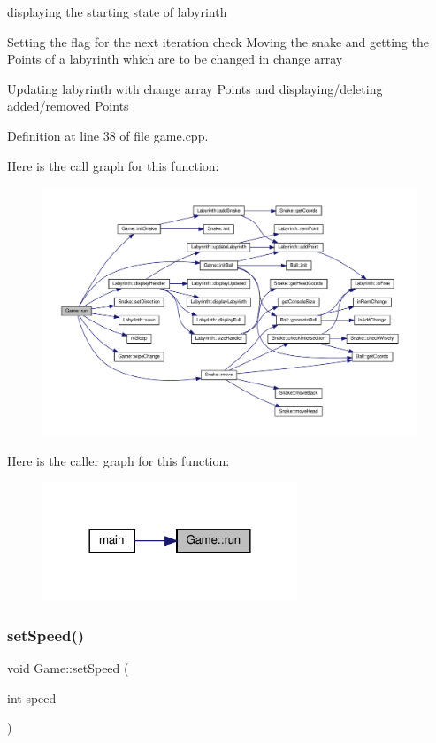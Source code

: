 displaying the starting state of labyrinth

Setting the flag for the next iteration check Moving the snake and getting the Points of a labyrinth which are to be changed in change array

Updating labyrinth with change array Points and displaying/deleting added/removed Points

Definition at line 38 of file game.\+cpp.

Here is the call graph for this function\+:
\nopagebreak
\begin{figure}[H]
\begin{center}
\leavevmode
\includegraphics[width=350pt]{class_game_a99fb161fbbe87d25a8b73265a0611e58_cgraph}
\end{center}
\end{figure}
Here is the caller graph for this function\+:
\nopagebreak
\begin{figure}[H]
\begin{center}
\leavevmode
\includegraphics[width=216pt]{class_game_a99fb161fbbe87d25a8b73265a0611e58_icgraph}
\end{center}
\end{figure}
\mbox{\label{class_game_a5f3fdd22fa8ae39d6912ee3ff029ea46}} 
\subsubsection{\texorpdfstring{setSpeed()}{setSpeed()}}
{\footnotesize\ttfamily void Game\+::set\+Speed (\begin{DoxyParamCaption}\item[{int}]{speed }\end{DoxyParamCaption})\hspace{0.3cm}{\ttfamily [private]}}


